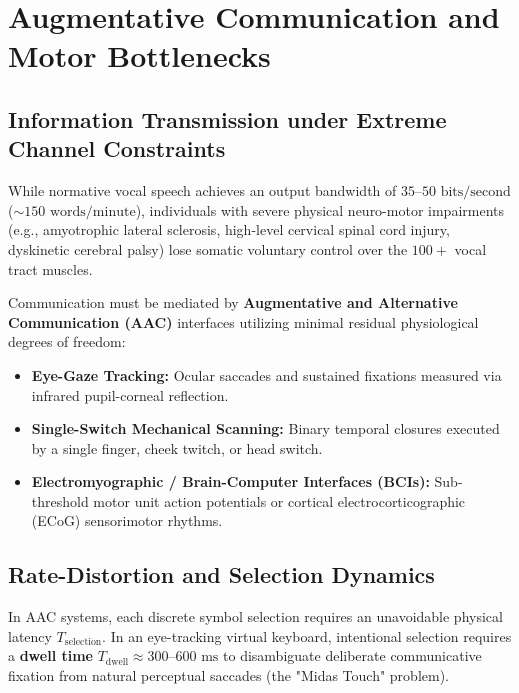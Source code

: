\documentclass[11pt,letterpaper]{article}
\begin{document}
\section{Augmentative Communication and Motor Bottlenecks}

\subsection{Information Transmission under Extreme Channel Constraints}
While normative vocal speech achieves an output bandwidth of $35$--$50\text{ bits/second}$ ($\sim 150\text{ words/minute}$), individuals with severe physical neuro-motor impairments (e.g., amyotrophic lateral sclerosis, high-level cervical spinal cord injury, dyskinetic cerebral palsy) lose somatic voluntary control over the $100+$ vocal tract muscles.

Communication must be mediated by \textbf{Augmentative and Alternative Communication (AAC)} interfaces utilizing minimal residual physiological degrees of freedom:
\begin{itemize}[noitemsep,topsep=1.5pt]
    \item \textbf{Eye-Gaze Tracking:} Ocular saccades and sustained fixations measured via infrared pupil-corneal reflection.
    \item \textbf{Single-Switch Mechanical Scanning:} Binary temporal closures executed by a single finger, cheek twitch, or head switch.
    \item \textbf{Electromyographic / Brain-Computer Interfaces (BCIs):} Sub-threshold motor unit action potentials or cortical electrocorticographic (ECoG) sensorimotor rhythms.
\end{itemize}

\subsection{Rate-Distortion and Selection Dynamics}
In AAC systems, each discrete symbol selection requires an unavoidable physical latency $T_{\text{selection}}$. In an eye-tracking virtual keyboard, intentional selection requires a \textbf{dwell time} $T_{\text{dwell}} \approx 300$--$600\text{ ms}$ to disambiguate deliberate communicative fixation from natural perceptual saccades (the "Midas Touch" problem).
\end{document}
